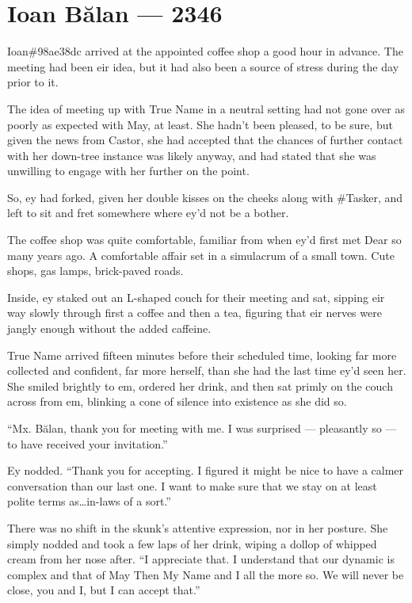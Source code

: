 \hypertarget{ioan-bux103lan-2346}{%
\chapter{Ioan Bălan — 2346}\label{ioan-bux103lan-2346}}

Ioan\#98ae38dc arrived at the appointed coffee shop a good hour in advance. The meeting had been eir idea, but it had also been a source of stress during the day prior to it.

The idea of meeting up with True Name in a neutral setting had not gone over as poorly as expected with May, at least. She hadn't been pleased, to be sure, but given the news from Castor, she had accepted that the chances of further contact with her down-tree instance was likely anyway, and had stated that she was unwilling to engage with her further on the point.

So, ey had forked, given her double kisses on the cheeks along with \#Tasker, and left to sit and fret somewhere where ey'd not be a bother.

The coffee shop was quite comfortable, familiar from when ey'd first met Dear so many years ago. A comfortable affair set in a simulacrum of a small town. Cute shops, gas lamps, brick-paved roads.

Inside, ey staked out an L-shaped couch for their meeting and sat, sipping eir way slowly through first a coffee and then a tea, figuring that eir nerves were jangly enough without the added caffeine.

True Name arrived fifteen minutes before their scheduled time, looking far more collected and confident, far more herself, than she had the last time ey'd seen her. She smiled brightly to em, ordered her drink, and then sat primly on the couch across from em, blinking a cone of silence into existence as she did so.

``Mx. Bălan, thank you for meeting with me. I was surprised — pleasantly so — to have received your invitation.''

Ey nodded. ``Thank you for accepting. I figured it might be nice to have a calmer conversation than our last one. I want to make sure that we stay on at least polite terms as\ldots in-laws of a sort.''

There was no shift in the skunk's attentive expression, nor in her posture. She simply nodded and took a few laps of her drink, wiping a dollop of whipped cream from her nose after. ``I appreciate that. I understand that our dynamic is complex and that of May Then My Name and I all the more so. We will never be close, you and I, but I can accept that.''

